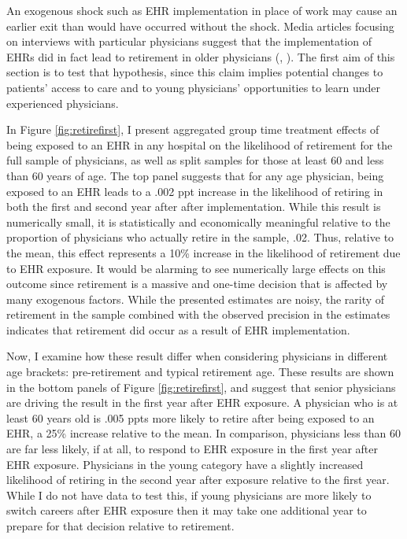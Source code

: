 \documentclass[11pt]{article}
\begin{document}
An exogenous shock such as EHR implementation in place of work may cause an earlier exit than would have occurred without the shock. Media articles focusing on interviews with particular physicians suggest that the implementation of EHRs did in fact lead to retirement in older physicians (\cite{ringel_2019}, \cite{loria_2020}). The first aim of this section is to test that hypothesis, since this claim implies potential changes to patients' access to care and to young physicians' opportunities to learn under experienced physicians. 

In Figure \ref{fig:retirefirst}, I present aggregated group time treatment effects of being exposed to an EHR in any hospital on the likelihood of retirement for the full sample of physicians, as well as split samples for those at least 60 and less than 60 years of age. The top panel suggests that for any age physician, being exposed to an EHR leads to a .002 ppt increase in the likelihood of retiring in both the first and second year after after implementation. While this result is numerically small, it is statistically and economically meaningful relative to the proportion of physicians who actually retire in the sample, .02. Thus, relative to the mean, this effect represents a 10\% increase in the likelihood of retirement due to EHR exposure. It would be alarming to see numerically large effects on this outcome since retirement is a massive and one-time decision that is affected by many exogenous factors. While the presented estimates are noisy, the rarity of retirement in the sample combined with the observed precision in the estimates indicates that retirement did occur as a result of EHR implementation.


Now, I examine how these result differ when considering physicians in different age brackets: pre-retirement and typical retirement age. These results are shown in the bottom panels of Figure \ref{fig:retirefirst}, and suggest that senior physicians are driving the result in the first year after EHR exposure. A physician who is at least 60 years old is .005 ppts more likely to retire after being exposed to an EHR, a 25\% increase relative to the mean. In comparison, physicians less than 60 are far less likely, if at all, to respond to EHR exposure in the first year after EHR exposure. Physicians in the young category have a slightly increased likelihood of retiring in the second year after exposure relative to the first year. While I do not have data to test this, if young physicians are more likely to switch careers after EHR exposure then it may take one additional year to prepare for that decision relative to retirement.   
\end{document}
